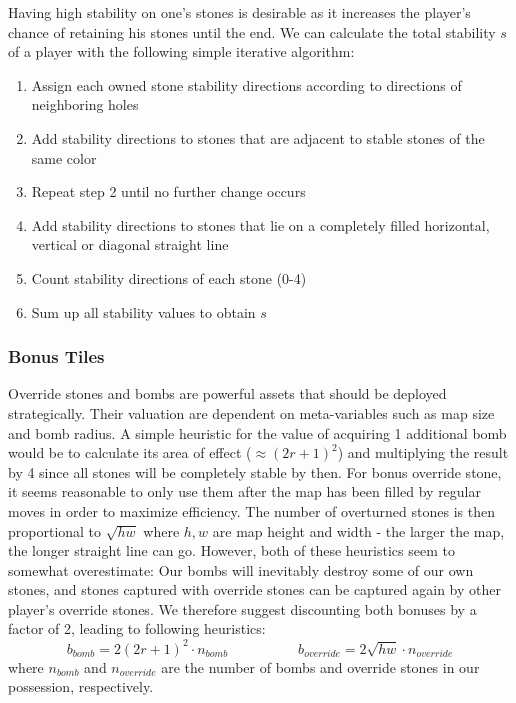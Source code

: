 \documentclass[a4paper,12pt]{article}
\begin{document}
Having high stability on one's stones is desirable as it increases the player's chance of retaining his stones until the end. We can calculate the total stability $s$ of a player with the following simple iterative algorithm:

\begin{enumerate}
    \item Assign each owned stone stability directions according to directions of neighboring holes
    \item Add stability directions to stones that are adjacent to stable stones of the same color
    \item Repeat step 2 until no further change occurs
    \item Add stability directions to stones that lie on a completely filled horizontal, vertical or diagonal straight line
    \item Count stability directions of each stone (0-4)
    \item Sum up all stability values to obtain $s$
\end{enumerate}


\subsubsection{Bonus Tiles}
Override stones and bombs are powerful assets that should be deployed strategically. Their valuation are dependent on meta-variables such as map size and bomb radius. A simple heuristic for the value of acquiring 1 additional bomb would be to calculate its area of effect ($\approx (2r+1)^2$) and multiplying the result by 4 since all stones will be completely stable by then. For bonus override stone, it seems reasonable to only use them after the map has been filled by regular moves in order to maximize efficiency. The number of overturned stones is then proportional to $\sqrt{hw}$ where $h, w$ are map height and width - the larger the map, the longer straight line can go. However, both of these heuristics seem to somewhat overestimate: Our bombs will inevitably destroy some of our own stones, and stones captured with override stones can be captured again by other player's override stones. We therefore suggest discounting both bonuses by a factor of 2, leading to following heuristics: 
\[ b_{bomb} = 2(2r+1)^2 \cdot n_{bomb} \quad \quad \quad \quad \quad b_{override} = 2 \sqrt{hw} \cdot n_{override}\]
where $n_{bomb}$ and $n_{override}$ are the number of bombs and override stones in our possession, respectively.
\end{document}
